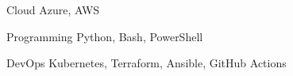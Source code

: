 


\begin{cvskills}


\cvskill
{Cloud} %
{Azure, AWS} %


\cvskill
{Programming} %
{Python, Bash, PowerShell} %


\cvskill
{DevOps} %
{Kubernetes, Terraform, Ansible, GitHub Actions} %


\end{cvskills}
